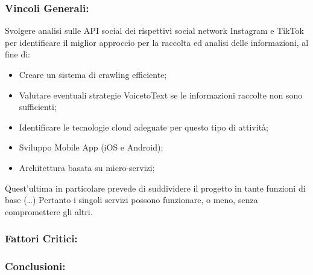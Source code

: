\subsubsection{Vincoli Generali:}
Svolgere analisi sulle API social dei rispettivi social network Instagram e TikTok per identificare il miglior approccio per la raccolta ed analisi delle informazioni, al fine di:
\begin{itemize}
	\item Creare un sistema di crawling efficiente;
	\item Valutare eventuali strategie VoicetoText se le informazioni raccolte non sono sufficienti;
	\item Identificare le tecnologie cloud adeguate per questo tipo di attività;
	\item Sviluppo Mobile App (iOS e Android);
	\item Architettura basata su micro-servizi; 
\end{itemize}
Quest'ultima in particolare prevede di suddividere il progetto in tante funzioni di base (…) Pertanto i singoli servizi possono funzionare, o meno, senza compromettere gli altri.


\subsubsection{Fattori Critici:}

\subsubsection{Conclusioni:}
